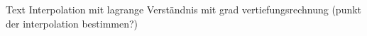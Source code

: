 {
	Text
	}{
		\itemf Interpolation mit lagrange
		\itemf Verständnis mit grad
		\itemf vertiefungsrechnung (punkt der interpolation bestimmen?)
	}{
		\itemf
}